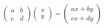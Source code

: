 \documentclass{article}
\begin{document}
\[
  \begin{pmatrix} a & b \\ c & d \end{pmatrix}
  \begin{pmatrix} x \\ y \end{pmatrix}
  =
  \begin{pmatrix} ax + by \\ cx + dy \end{pmatrix}
\]
\end{document}
